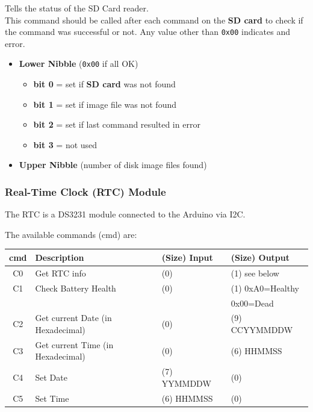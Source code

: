 \documentclass[a4paper,11pt]{article}
\begin{document}
    Tells the status of the SD Card reader.\\

    This command should be called after each command on the \textbf{SD card} to
    check if the command was successful or not. Any value other than
    \texttt{0x00} indicates and error.

     \begin{itemize}
        \item \textbf{Lower Nibble} (\texttt{0x00} if all OK)
        \begin{itemize}
            \item \textbf{bit 0} = set if \textbf{SD card} was not found
            \item \textbf{bit 1} = set if image file was not found
            \item \textbf{bit 2} = set if last command resulted in error
            \item \textbf{bit 3} = not used
        \end{itemize}
        \item \textbf{Upper Nibble} (number of disk image files found)
    \end{itemize}

    \subsubsection{Real-Time Clock (RTC) Module}

    The RTC is a DS3231 module connected to the Arduino via I2C.

    The available commands (cmd) are:

    \begin{tabular}{| c | m{3.8cm} | m{3cm} | m{3.5cm} | }
        \hline
        \rowcolor{lightgray}
        cmd & Description & (Size) Input & (Size) Output\\
        \hline
        C0 & Get RTC info & (0) & (1) see below\\
        \hline
        C1 & Check Battery Health & (0) & (1) 0xA0=Healthy\\
           &                      &     &     0x00=Dead\\
        \hline
        C2 & Get current Date (in Hexadecimal) & (0) & (9) CCYYMMDDW\\
        \hline
        C3 & Get current Time (in Hexadecimal) & (0) & (6) HHMMSS\\
        \hline
        C4 & Set Date & (7) YYMMDDW & (0)\\
        \hline
        C5 & Set Time & (6) HHMMSS & (0)\\
        \hline
    \end{tabular}
\end{document}
